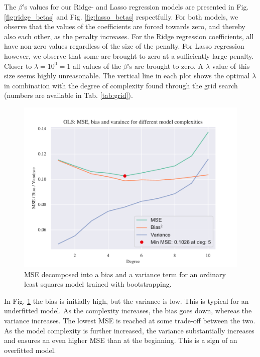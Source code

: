 The $\beta$'s values for our Ridge- and Lasso regression models are presented in Fig. \ref{fig:ridge_betas} and Fig. \ref{fig:lasso_betas} respectfully. For both models, we observe that the values of the coefficients are forced towards zero, and thereby also each other, as the penalty increases. For the Ridge regression coefficients, all have non-zero values regardless of the size of the penalty. For Lasso regression however, we observe that some are brought to zero at a sufficiently large penalty. Closer to $\lambda = 10^0 = 1$ all values of the $\beta$'s are brought to zero. A $\lambda$ value of this size seems highly unreasonable. The vertical line in each plot shows the optimal $\lambda$ in combination with the degree of complexity found through the grid search (numbers are available in Tab. \ref{tab:grid}). 

\begin{figure}
    \centering
    \includegraphics[width=1\linewidth]{project_1_alt/figures/figures_in_report/bias_var_Franke_Noise_bootstrap.pdf}
    \caption{MSE decomposed into a bias and a variance term for an ordinary least squares model trained with bootstrapping. }
    \label{bias_var_trade}
\end{figure}

In Fig. \ref{bias_var_trade} the bias is initially high, but the variance is low. This is typical for an underfitted model. As the complexity increases, the bias goes down, whereas the variance increases. The lowest MSE is reached at some trade-off between the two. As the model complexity is further increased, the variance substantially increases and ensures an even higher MSE than at the beginning. This is a sign of an overfitted model.

